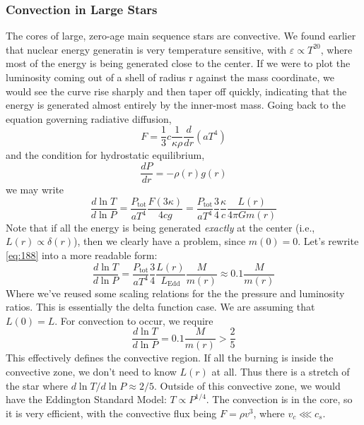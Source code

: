\documentclass[10pt]{article}
\numberwithin{equation}{section}
\begin{document}
    \subsubsection{Convection in Large Stars}
    \label{sec:conv-large-stars}

    The cores of large, zero-age main sequence stars are
    convective. We found earlier that nuclear energy generatin is very
    temperature sensitive, with $\varepsilon\propto T^{20}$, where
    most of the energy is being generated close to the center. If we
    were to plot the luminosity coming out of a shell of radius r
    against the mass coordinate, we would see the curve rise sharply
    and then taper off quickly, indicating that the energy is
    generated almost entirely by the inner-most mass. Going back to
    the equation governing radiative diffusion, 
    \begin{equation}
      \label{eq:187}
      F=\frac{1}{3}c\frac{1}{\kappa\rho}\frac{d}{dr}\left(aT^4\right)
    \end{equation}
    and the condition for hydrostatic equilibrium,
    \begin{equation}
      \label{eq:189}
      \frac{dP}{dr}=-\rho(r)g(r)
    \end{equation}
    we may write
    \begin{equation}
      \label{eq:188}
      \frac{d\ln T}{d\ln
        P}=\frac{P_{\mathrm{tot}}}{aT^4}\frac{F(3\kappa)}{4c
        g}=\frac{P_{\mathrm{tot}}}{aT^4}\frac{3}{4}\frac{\kappa}{c}\frac{L(r)}{4\pi Gm(r)}
    \end{equation}
    Note that if all the energy is being generated \emph{exactly} at
    the center (i.e., $L(r)\propto \delta(r)$), then we clearly have a
    problem, since $m(0)=0$. Let's rewrite \eqref{eq:188} into a more
    readable form:
    \begin{equation}
      \label{eq:190}
      \frac{d\ln T}{d\ln
        P}=\frac{P_{\mathrm{tot}}}{aT^4}\frac{3}{4}\frac{L(r)}{L_{\mathrm{Edd}}}\frac{M}{m(r)}\approx
      0.1\frac{M}{m(r)}
    \end{equation}
    Where we've reused some scaling relations for the the pressure and
    luminosity ratios. This is essentially the delta function case. We
    are assuming that $L(0)=L$. For convection to occur, we require
    \begin{equation}
      \label{eq:191}
      \frac{d\ln T}{d\ln P}=0.1\frac{M}{m(r)}>\frac{2}{5}
    \end{equation}
    This effectively defines the convective region. If all the burning
    is inside the convective zone, we don't need to know $L(r)$ at
    all. Thus there is a stretch of the star where $d\ln T/d\ln P
    \approx 2/5$. Outside of this convective zone, we would have
    the Eddington Standard Model: $T\propto P^{1/4}$. The convection
    is in the core, so it is very efficient, with the convective flux
    being $F=\rho v^3$, where $v_c\lll c_s$.\\
\end{document}
